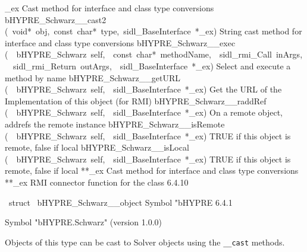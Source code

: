 \documentclass{article}
\begin{document}
\begin{cxxentry}
\begin{cxxentry}
\begin{cxxnames}
        {\_ex}
        {}
        {
Cast method for interface and class type conversions}
        {}
\label{cxx.6.4.29}
        {bHYPRE\_Schwarz\_\_cast2}
        {(\ void*\ obj,\ const\ char*\ type,\ sidl\_BaseInterface\ *\_ex)}
        {
String cast method for interface and class type conversions}
        {}
\label{cxx.6.4.30}
        {bHYPRE\_Schwarz\_\_exec}
        {(\ \ bHYPRE\_Schwarz\ self,\ \ const\ char*\ methodName,\ \ sidl\_rmi\_Call\ inArgs,\ \ sidl\_rmi\_Return\ outArgs,\ \ sidl\_BaseInterface\ *\_ex)}
        {
Select and execute a method by name}
        {}
\label{cxx.6.4.31}
        {bHYPRE\_Schwarz\_\_getURL}
        {(\ \ bHYPRE\_Schwarz\ self,\ \ sidl\_BaseInterface\ *\_ex)}
        {
Get the URL of the Implementation of this object (for RMI)}
        {}
\label{cxx.6.4.32}
        {bHYPRE\_Schwarz\_\_raddRef}
        {(\ \ bHYPRE\_Schwarz\ self,\ \ sidl\_BaseInterface\ *\_ex)}
        {
On a remote object, addrefs the remote instance}
        {}
\label{cxx.6.4.33}
        {bHYPRE\_Schwarz\_\_isRemote}
        {(\ \ bHYPRE\_Schwarz\ self,\ \ sidl\_BaseInterface\ *\_ex)}
        {
TRUE if this object is remote, false if local}
        {}
\label{cxx.6.4.34}
        {bHYPRE\_Schwarz\_\_isLocal}
        {(\ \ bHYPRE\_Schwarz\ self,\ \ sidl\_BaseInterface\ *\_ex)}
        {
TRUE if this object is remote, false if local}
        {}
\label{cxx.6.4.35}
        {**\_ex}
        {}
        {
Cast method for interface and class type conversions}
        {}
\label{cxx.6.4.36}
        {**\_ex}
        {}
        {
RMI connector function for the class}
        {6.4.10}
\end{cxxnames}
\begin{cxxvariable}
{\ struct\ }
        {bHYPRE\_Schwarz\_\_object}
        {}
        {
Symbol "bHYPRE}
        {6.4.1}
\begin{cxxdoc}

Symbol "bHYPRE.Schwarz" (version 1.0.0)

Objects of this type can be cast to Solver objects using the
{\tt \_\_cast} methods.


\end{cxxdoc}
\end{cxxvariable}
\end{cxxentry}
\end{cxxentry}
\end{document}
